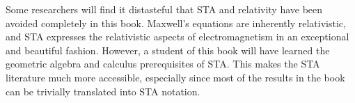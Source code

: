 Some researchers will find it distasteful that STA and relativity have been avoided completely in this book.
Maxwell's equations are inherently relativistic, and
STA expresses the relativistic aspects of electromagnetism in an exceptional and beautiful fashion.
However, a student of this book will have learned the geometric algebra and calculus prerequisites of STA.
This makes the STA literature much more accessible, especially since most of the
results in the book can be trivially translated into STA notation.
